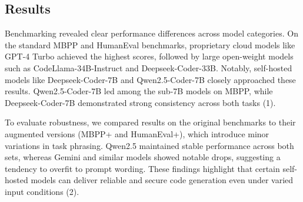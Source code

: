 \documentclass[a0,portrait,english]{hogent-poster}
\begin{document}
\begin{multicols}{2}
	\section{Results}
	Benchmarking revealed clear performance differences across model categories. On the standard MBPP and HumanEval benchmarks, proprietary cloud models like GPT-4 Turbo achieved the highest scores, followed by large open-weight models such as CodeLlama-34B-Instruct and Deepseek-Coder-33B. Notably, self-hosted models like Deepseek-Coder-7B and Qwen2.5-Coder-7B closely approached these results. Qwen2.5-Coder-7B led among the sub-7B models on MBPP, while Deepseek-Coder-7B demonstrated strong consistency across both tasks (1).

	To evaluate robustness, we compared results on the original benchmarks to their augmented versions (MBPP+ and HumanEval+), which introduce minor variations in task phrasing. Qwen2.5 maintained stable performance across both sets, whereas Gemini and similar models showed notable drops, suggesting a tendency to overfit to prompt wording. These findings highlight that certain self-hosted models can deliver reliable and secure code generation even under varied input conditions (2).


\end{multicols}
\end{document}
